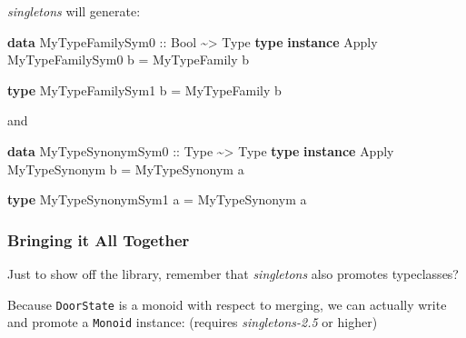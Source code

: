 \documentclass[]{article}
\newenvironment{Shaded}{}{}
\newcommand{\DataTypeTok}[1]{\textcolor[rgb]{0.56,0.13,0.00}{#1}}
\newcommand{\KeywordTok}[1]{\textcolor[rgb]{0.00,0.44,0.13}{\textbf{#1}}}
\newcommand{\NormalTok}[1]{#1}
\newcommand{\OperatorTok}[1]{\textcolor[rgb]{0.40,0.40,0.40}{#1}}
\newcommand{\OtherTok}[1]{\textcolor[rgb]{0.00,0.44,0.13}{#1}}
\begin{document}
\begin{Shaded}
\end{Shaded}

\emph{singletons} will generate:

\begin{Shaded}
\begin{Highlighting}[]
\KeywordTok{data} \DataTypeTok{MyTypeFamilySym0}\OtherTok{ ::} \DataTypeTok{Bool} \OperatorTok{\textasciitilde{}\textgreater{}} \DataTypeTok{Type}
\KeywordTok{type} \KeywordTok{instance} \DataTypeTok{Apply} \DataTypeTok{MyTypeFamilySym0}\NormalTok{ b }\OtherTok{=} \DataTypeTok{MyTypeFamily}\NormalTok{ b}

\KeywordTok{type} \DataTypeTok{MyTypeFamilySym1}\NormalTok{ b }\OtherTok{=} \DataTypeTok{MyTypeFamily}\NormalTok{ b}
\end{Highlighting}
\end{Shaded}

and

\begin{Shaded}
\begin{Highlighting}[]
\KeywordTok{data} \DataTypeTok{MyTypeSynonymSym0}\OtherTok{ ::} \DataTypeTok{Type} \OperatorTok{\textasciitilde{}\textgreater{}} \DataTypeTok{Type}
\KeywordTok{type} \KeywordTok{instance} \DataTypeTok{Apply} \DataTypeTok{MyTypeSynonym}\NormalTok{ b }\OtherTok{=} \DataTypeTok{MyTypeSynonym}\NormalTok{ a}

\KeywordTok{type} \DataTypeTok{MyTypeSynonymSym1}\NormalTok{ a }\OtherTok{=} \DataTypeTok{MyTypeSynonym}\NormalTok{ a}
\end{Highlighting}
\end{Shaded}

\subsubsection{Bringing it All Together}\label{bringing-it-all-together}

Just to show off the library, remember that \emph{singletons} also promotes
typeclasses?

Because \texttt{DoorState} is a monoid with respect to merging, we can actually
write and promote a \texttt{Monoid} instance: (requires \emph{singletons-2.5} or
higher)

\begin{Shaded}
\end{Shaded}
\end{document}
